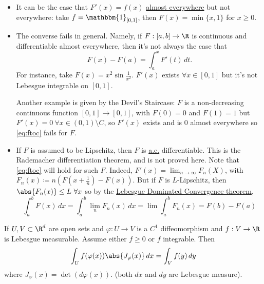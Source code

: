 \documentclass{article}
\newcommand{\1}[1]{\mathbbm{1}_{#1}}
\begin{document}
\begin{remark}\leavevmode
    \begin{itemize}
        \item It can be the case that $F'(x) = f(x)$ \hyperlink{def:ae}{almost everywhere} but not everywhere: take $f = \1{[0, 1]}$, then $F(x) = \min\{x, 1\}$ for $x \geq 0$.

        \item The converse fails in general.
            Namely, if $F:[a, b] \to \R$ is continuous and differentiable almost everywhere, then it's not always the case that
            \begin{equation*}F(x) - F(a) = \int_a^x F'(t) \, dt. \tag{$*$}\label{eq:ftoc}\end{equation*}
            For instance, take $F(x) = x^2 \sin{\frac{1}{x^2}}$.
            $F'(x)$ exists $\forall x \in [0, 1]$ but it's not Lebesgue integrable on $[0, 1]$.

            Another example is given by the Devil's Staircase:
            $F$ is a non-decreasing continuous function $[0, 1] \to [0, 1]$, with $F(0) = 0$ and $F(1) = 1$ but $F'(x) = 0 \ \forall x \in (0, 1) \setminus C$, so $F'(x)$ exists and is $0$ almost everywhere so \eqref{eq:ftoc} fails for $F$.

        \item If $F$ is assumed to be Lipschitz, then $F$ is \hyperlink{def:ae}{a.e.} differentiable.
            This is the Rademacher differentiation theorem, and is not proved here.
            Note that \eqref{eq:ftoc}
            will hold for such $F$. Indeed, $F'(x) = \lim_{n \to \infty} F_n(X)$, with $F_n(x) \coloneqq n(F(x + \frac{1}{n}) - F(x))$.
            But if $F$ is $L$-Lipschitz, then $\abs{F_n(x)} \leq L \ \forall x$ so by the \hyperlink{thm:dct}{Lebesgue Dominated Convergence theorem},
            \begin{equation*}
                \int_a^b F(x) \, dx = \int_a^b \lim_n F_n(x) \, dx = \lim \int_a^b F_n(x) = F(b) - F(a)
            \end{equation*}
    \end{itemize}
\end{remark}

\begin{thm}
    If $U, V \subset \R^d$ are open sets and $\varphi:U \to V$ is a $C^1$ diffeomorphism and $f: V \to \R$ is Lebesgue measurable. Assume either $f \geq 0$ or $f$ integrable. Then
    \begin{equation*}
        \int_U f(\varphi(x)) \abs{J_\varphi(x)} \, dx = \int_V f(y) \, dy
    \end{equation*}
    where $J_\varphi(x) = \det(d \varphi(x))$.
    (both $dx$ and $dy$ are Lebesgue measure).
\end{thm}
\end{document}

